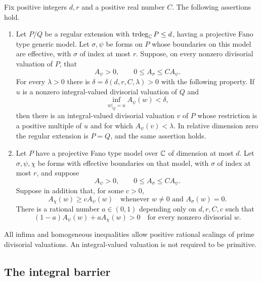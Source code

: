 \begin{theorem}
\label{thm:lifting-mixing}
Fix positive integers $d,r$ and a positive real number $C$.
The following assertions hold.
\begin{enumerate}[label=\textup{(\arabic*)}]
\item\label{ij:lifting-item}
Let $P/Q$ be a regular extension with
$\operatorname{trdeg}_{\mathbb C}P\le d$, having a projective Fano type
generic model.  Let $\sigma,\psi$ be forms on $P$ whose boundaries on
this model are effective, with $\sigma$ of index at most $r$.
Suppose, on every nonzero divisorial valuation of $P$, that
\[
 A_\psi>0,\qquad 0\le A_\sigma\le C A_\psi.
\]
For every $\lambda>0$ there is
$\delta=\delta(d,r,C,\lambda)>0$ with the following property.
If $u$ is a nonzero integral-valued divisorial valuation of $Q$ and
\[
 \inf_{w|_Q=u}A_\psi(w)<\delta,
\]
then there is an integral-valued divisorial valuation $v$ of $P$
whose restriction is a positive multiple of $u$ and for which
$A_\psi(v)<\lambda$.  In relative dimension zero the regular
extension is $P=Q$, and the same assertion holds.
\item\label{ij:mixing-item}
Let $P$ have a projective Fano type model over $\mathbb C$ of dimension at
most $d$.  Let $\sigma,\psi,\chi$ be forms with effective boundaries
on that model, with $\sigma$ of index at most $r$, and suppose
\[
 A_\psi>0,\qquad 0\le A_\sigma\le C A_\psi.
\]
Suppose in addition that, for some $c>0$,
\[
 A_\chi(w)\ge c A_\psi(w)
 \quad\text{whenever }w\ne0\text{ and }A_\sigma(w)=0.
\]
There is a rational number $a\in(0,1)$ depending only on
$d,r,C,c$ such that
\[
 (1-a)A_\psi(w)+aA_\chi(w)>0
 \quad\text{for every nonzero divisorial }w.
\]
\end{enumerate}
All infima and homogeneous inequalities allow positive rational
scalings of prime divisorial valuations.  An integral-valued
valuation is not required to be primitive.
\end{theorem}

\subsection{The integral barrier}


